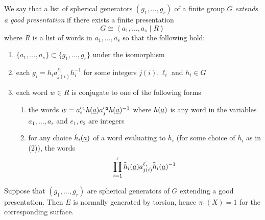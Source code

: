 \documentclass[main.tex]{subfiles}
\begin{document}
\begin{defn}
We say that a list of spherical generators $(g_1, \dots, g_r)$ of a finite group $G$ \textit{extends a good presentation} if there exists a finite presentation
\[ G \cong \left< a_1, \dots, a_s \mid R \right> \]
where $R$ is a list of words in $a_1, \dots, a_s$ so that the following hold:
\begin{enumerate}
    \item $\{ a_1, \dots, a_s \} \subset \{ g_1, \dots, g_r \}$ under the isomorphism
    \item each $g_i = h_i a_{j(i)}^{\ell_i} h_i^{-1}$ for some integers $j(i), \ell_i$ and $h_i \in G$ 
    \item each word $w \in R$ is conjugate to one of the following forms
    \begin{enumerate}
        \item the words $w = a_i^{e_1} h(\underline{a}) a_j^{e_2} h(\underline{a})^{-1}$ where $h(\underline{a})$ is any word in the variables $a_1, \dots, a_s$ and $e_1, e_2$ are integers
        \item for any choice $\tilde{h}_i(\underline{a})$ of a word evaluating to $h_i$ (for some choice of $h_i$ as in (2)), the words
        \[ \prod_{i = 1}^r \tilde{h}_i(\underline{a}) a_{j(i)}^{\ell_i} \tilde{h}_i(\underline{a})^{-1} \]
    \end{enumerate}
\end{enumerate}
\end{defn}

\begin{prop} \label{prop:extends_good_presentation_normally_generated}
Suppose that $(g_1, \dots, g_r)$ are spherical generators of $G$ extending a good presentation. Then $E$ is normally generated by torsion, hence $\pi_1(X) = 1$ for the corresponding surface.  
\end{prop}
\end{document}
